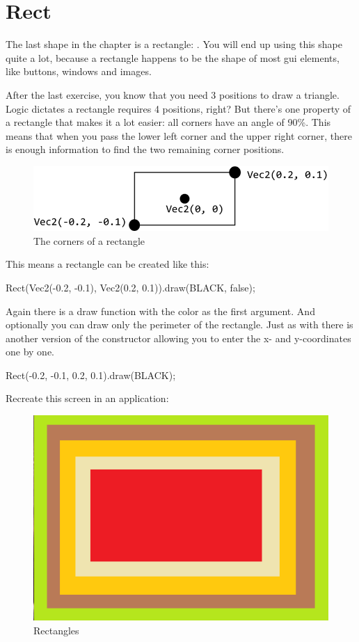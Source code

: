 \section{Rect}
The last shape in the chapter is a rectangle: . You will end up using this shape quite a lot, because a rectangle happens to be the shape of most gui elements, like buttons, windows and images.

After the last exercise, you know that you need 3 positions to draw a triangle. Logic dictates a rectangle requires 4 positions, right? But there's one property of a rectangle that makes it a lot easier: all corners have an angle of 90\%. This means that when you pass the lower left corner and the upper right corner, there is enough information to find the two remaining corner positions.

\begin{figure}[h]
\centering
\includegraphics[width=0.8\linewidth]{images/rectangle.png}
\caption[]{The corners of a rectangle}
\label{fig:rect}
\end{figure}

This means a rectangle can be created like this:

\begin{code}
Rect(Vec2(-0.2, -0.1), Vec2(0.2, 0.1)).draw(BLACK, false);
\end{code}

Again there is a draw function with the color as the first argument. And optionally you can draw only the perimeter of the rectangle. Just as with  there is another version of the constructor allowing you to enter the x- and y-coordinates one by one.

\begin{code}
Rect(-0.2, -0.1, 0.2, 0.1).draw(BLACK);
\end{code}

\begin{exercise}
Recreate this screen in an application:

\begin{figure}[h]
\centering
\includegraphics[width=0.4\linewidth]{images/nested_rectangles.png}
\caption[]{Rectangles}
\label{fig:nested_rect}
\end{figure}
\end{exercise}

